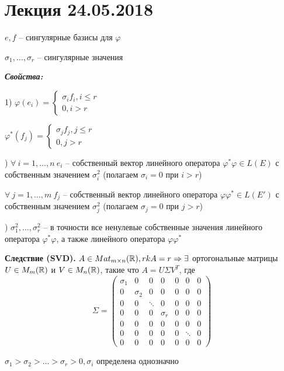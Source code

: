 \section{Лекция 24.05.2018}

$e, f$ -- сингулярные базисы для $\varphi$

$\sigma_1, \dots, \sigma_r$ -- сингулярные значения

\bigskip
\textbf{\textit{Свойства:}}

1) $\varphi(e_i) = \begin{cases} \sigma_i f_i, i \leqslant r \\ 0, i > r \end{cases}$

$\varphi^*(f_j) = \begin{cases} \sigma_j f_j, j \leqslant r \\ 0, j > r \end{cases}$

) $\forall \ i = 1, \dots, n \ e_i$ -- собственный вектор линейного оператора $\varphi^* \varphi \in L(E)$ с собственным значением $\sigma_i^2$ (полагаем $\sigma_i = 0$ при $i > r$) 

$\forall \ j = 1, \dots, m \ f_j$ -- собственный вектор линейного оператора $\varphi \varphi^* \in L(E')$ с собственным значением $\sigma_j^2$ (полагаем $\sigma_j = 0$ при $j > r$) 

) $\sigma_1^2, \dots, \sigma_r^2$ -- в точности все ненулевые собственные значения линейного оператора $\varphi^* \varphi$, а также линейного оператора $\varphi \varphi^*$

\bigskip
\textbf{Следствие (SVD).} $A \in Mat_{m \times n} (\mathbb{R}), rkA = r \Rightarrow \exists$ ортогональные матрицы $U \in M_m(\mathbb{R})$ и $V \in M_n(\mathbb{R})$, такие что $A = U \Sigma V^T$, где \begin{equation*}\Sigma = \begin{pmatrix} \sigma_1 & 0 & 0 & 0 & 0 & 0 & 0 \\  0 & \sigma_2 & 0 & 0 & 0 & 0 & 0 \\ 0 & 0 & \ddots & 0 & 0 & 0 & 0 \\ 0 & 0 & 0 & \sigma_r & 0 & 0 & 0 \\ 0 & 0 & 0 & 0 & 0 & 0 & 0 \\ 0 & 0 & 0 & 0 & 0 & \ddots & 0 \\ 0 & 0 & 0 & 0 & 0 & 0 & 0 \end{pmatrix}\end{equation*}

$\sigma_1 > \sigma_2 > \dots > \sigma_r > 0, \sigma_i$ определена однозначно

